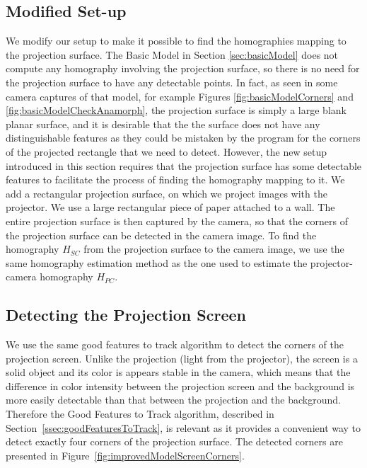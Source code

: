 \documentclass[11pt, oneside, reqno]{book}
\def\shadowshift{4pt,-4pt}
\def\shadowradius{6pt}
\newcommand\drawshadow[1]{
	\begin{pgfonlayer}{shadow}
		\shade[outercolor,inner color=innercolor,outer color=outercolor] ($(#1.south west)+(\shadowshift)+(\shadowradius/2,\shadowradius/2)$) circle (\shadowradius);
		\shade[outercolor,inner color=innercolor,outer color=outercolor] ($(#1.north west)+(\shadowshift)+(\shadowradius/2,-\shadowradius/2)$) circle (\shadowradius);
		\shade[outercolor,inner color=innercolor,outer color=outercolor] ($(#1.south east)+(\shadowshift)+(-\shadowradius/2,\shadowradius/2)$) circle (\shadowradius);
		\shade[outercolor,inner color=innercolor,outer color=outercolor] ($(#1.north east)+(\shadowshift)+(-\shadowradius/2,-\shadowradius/2)$) circle (\shadowradius);
		\shade[top color=innercolor,bottom color=outercolor] ($(#1.south west)+(\shadowshift)+(\shadowradius/2,-\shadowradius/2)$) rectangle ($(#1.south east)+(\shadowshift)+(-\shadowradius/2,\shadowradius/2)$);
		\shade[left color=innercolor,right color=outercolor] ($(#1.south east)+(\shadowshift)+(-\shadowradius/2,\shadowradius/2)$) rectangle ($(#1.north east)+(\shadowshift)+(\shadowradius/2,-\shadowradius/2)$);
		\shade[bottom color=innercolor,top color=outercolor] ($(#1.north west)+(\shadowshift)+(\shadowradius/2,-\shadowradius/2)$) rectangle ($(#1.north east)+(\shadowshift)+(-\shadowradius/2,\shadowradius/2)$);
		\shade[outercolor,right color=innercolor,left color=outercolor] ($(#1.south west)+(\shadowshift)+(-\shadowradius/2,\shadowradius/2)$) rectangle ($(#1.north west)+(\shadowshift)+(\shadowradius/2,-\shadowradius/2)$);
		\filldraw ($(#1.south west)+(\shadowshift)+(\shadowradius/2,\shadowradius/2)$) rectangle ($(#1.north east)+(\shadowshift)-(\shadowradius/2,\shadowradius/2)$);
	\end{pgfonlayer}
}
\newlength\mylen
\newcommand\shadowimage[2][]{%
	\setbox0=\hbox{\texttt{[image: \#2]}}
	\setlength\mylen{\wd0}
	\ifnum\mylen<\ht0
	\setlength\mylen{\ht0}
	\fi
	\divide \mylen by 120
	\def\shadowshift{\mylen,-\mylen}
	\def\shadowradius{\the\dimexpr\mylen+\mylen+\mylen\relax}
	\begin{tikzpicture}
	\node[anchor=south west,inner sep=0] (image) at (0,0) {\texttt{[image: \#2]}};
	\drawshadow{image}
	\end{tikzpicture}
}
\begin{document}
\subsection{Modified Set-up}
\label{ssec:improvedModelModifiedSetup}
We modify our setup to make it possible to find the homographies mapping to the projection surface. 
The Basic Model in Section \ref{sec:basicModel} does not compute any homography involving the projection surface, so there is no need for the projection surface to have any detectable points. In fact, as seen in some camera captures of that model, for example Figures \ref{fig:basicModelCorners} and \ref{fig:basicModelCheckAnamorph}, the projection surface is simply a large blank planar surface, and it is desirable that the the surface does not have any distinguishable features as they could be mistaken by the program for the corners of the projected rectangle that we need to detect. 
However, the new setup introduced in this section requires that the projection surface has some detectable features to facilitate the process of finding the homography mapping to it. We add a rectangular projection surface, on which we project images with the projector. We use a large rectangular piece of paper attached to a wall. The entire projection surface is then captured by the camera, so that the corners of the projection surface can be detected in the camera image.
To find the homography $H_{SC}$ from the projection surface to the camera image, we use the same homography estimation method as the one used to estimate the projector-camera homography $H_{PC}$.






\subsection{Detecting the Projection Screen}
\label{ssec:improvedModelProjectionScreen}

We use the same good features to track algorithm to detect the corners of the projection screen. Unlike the projection (light from the projector), the screen is a solid object and its color is appears stable in the camera, which means that the difference in color intensity between the projection screen and the background is more easily detectable than that between the projection and the background. Therefore the Good Features to Track algorithm, described in Section~\ref{ssec:goodFeaturesToTrack}, is relevant as it provides a convenient way to detect exactly four corners of the projection surface. The detected corners are presented in Figure~\ref{fig:improvedModelScreenCorners}.
\end{document}
